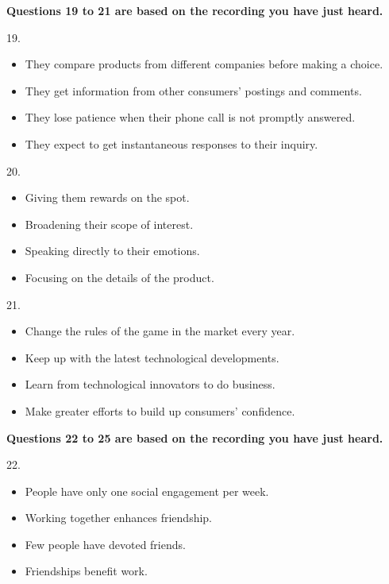 \documentclass[UTF8,11pt]{ctexart}
\begin{document}
\textbf{Questions 19 to 21 are based on the recording you have just heard.}


19.


\begin{itemize}[leftmargin=2em,itemsep=.2em,topsep=.4em]\item[A.] They compare products from different companies before making a choice.
\item[B.] They get information from other consumers’ postings and comments.
\item[C.] They lose patience when their phone call is not promptly answered.
\item[D.] They expect to get instantaneous responses to their inquiry.
\end{itemize}

20.


\begin{itemize}[leftmargin=2em,itemsep=.2em,topsep=.4em]\item[A.] Giving them rewards on the spot.
\item[B.] Broadening their scope of interest.
\item[C.] Speaking directly to their emotions.
\item[D.] Focusing on the details of the product.
\end{itemize}

21.


\begin{itemize}[leftmargin=2em,itemsep=.2em,topsep=.4em]\item[A.] Change the rules of the game in the market every year.
\item[B.] Keep up with the latest technological developments.
\item[C.] Learn from technological innovators to do business.
\item[D.] Make greater efforts to build up consumers’ confidence.
\end{itemize}

\textbf{Questions 22 to 25 are based on the recording you have just heard.}


22.


\begin{itemize}[leftmargin=2em,itemsep=.2em,topsep=.4em]\item[A.] People have only one social engagement per week.
\item[B.] Working together enhances friendship.
\item[C.] Few people have devoted friends.
\item[D.] Friendships benefit work.
\end{itemize}
\end{document}
